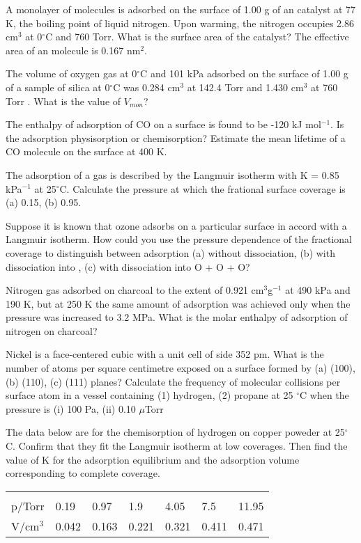 \documentclass[a4paper,12pt,titlepage]{article}
\begin{document}
\begin{ExerciseList}
\Exercise A monolayer of  molecules is adsorbed on the surface of 1.00 g of an  catalyst at 77 K, the boiling point of liquid nitrogen. Upon warming, the nitrogen occupies 2.86 cm\(^3\) at 0\(^\circ\)C and 760 Torr. What is the surface area of the catalyst? The effective area of an  molecule is 0.167 nm\(^2\).

The volume of oxygen gas at 0\(^\circ\)C and 101 kPa adsorbed on the surface of 1.00 g of a sample of silica at 0\(^\circ\)C was 0.284 cm\(^3\) at 142.4 Torr and 1.430 cm\(^3\) at 760 Torr . What is the value of \(V_{mon}\)?

\Exercise The enthalpy of adsorption of CO on a surface is found to be -120 kJ mol\(^{-1}\). Is the adsorption physisorption or chemisorption? Estimate the mean lifetime of a CO molecule on the surface at 400 K.

\Exercise The adsorption of a gas is described by the Langmuir isotherm with K = 0.85 kPa\(^{-1}\) at 25\(^\circ\)C. Calculate the pressure at which the frational surface coverage is (a) 0.15, (b) 0.95.

\Exercise Suppose it is known that ozone adsorbs on a particular surface in accord with a Langmuir isotherm. How could you use the pressure dependence of the fractional coverage to distinguish between adsorption (a) without dissociation, (b) with dissociation into , (c) with dissociation into O + O + O?

\Exercise Nitrogen gas adsorbed on charcoal to the extent of 0.921 cm\(^3\)g\(^{-1}\) at 490 kPa and 190 K, but at 250 K the same amount of adsorption was achieved only when the pressure was increased to 3.2 MPa. What is the molar enthalpy of adsorption of nitrogen on charcoal?

\Exercise Nickel is a face-centered cubic with a unit cell of side 352 pm. What is the number of atoms per square centimetre exposed on a surface formed by (a) (100), (b) (110), (c) (111) planes? Calculate the frequency of molecular collisions per surface atom in a vessel containing (1) hydrogen, (2) propane at 25 \(^\circ\)C when the pressure is (i) 100 Pa, (ii) 0.10 \(\mu\)Torr

\Exercise The data below are for the chemisorption of hydrogen on copper poweder at 25\(^\circ\)C. Confirm that they fit the Langmuir isotherm at low coverages. Then find the value of K for the adsorption equilibrium and the adsorption volume corresponding to complete coverage.

\begin{tabular}{lllllll}
\hline\\p/Torr & 0.19 & 0.97 & 1.9 & 4.05 & 7.5 & 11.95\\
V/cm\(^3\) & 0.042 & 0.163 & 0.221 & 0.321 & 0.411 & 0.471\\\hline
\end{tabular}


\end{ExerciseList}
\end{document}
